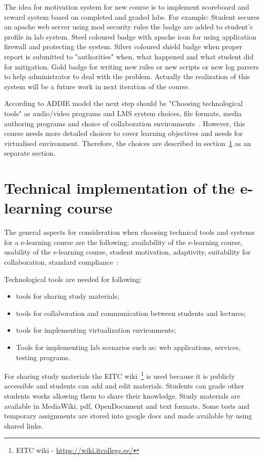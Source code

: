 The idea for motivation system for new course is to implement scoreboard and reward system based on completed and graded labs. For example: Student secures an apache web server using mod security rules the badge are added to student's profile in lab system. Steel coloured badge with apache icon for using application firewall and protecting the system. Silver coloured shield badge when proper report is submitted to "authorities" when, what happened and what student did for mitigation. Gold badge for writing new rules or new scripts or new log parsers to help administrator to deal with the problem. Actually the realization of this system will be a future work in next iteration of the course.

According to \gls{ADDIE} model the next step should be "Choosing technological tools" as audio/video programs and \gls{LMS} system choices, file formats, media authoring programs and choice of collaboration environments~\citep{OppeArenduskeskus2010}. However, this course needs more detailed choices to cover learning objectives and needs for virtualised environment. Therefore, the choices are described in section~\ref{Technical implementation of the e-learning course} as an separate section. 

\section{Technical implementation of the e-learning course}
\label{Technical implementation of the e-learning course}

The general aspects for consideration when choosing technical tools and systems for a e-learning course are the following: availability of the e-learning course, usability of the e-learning course, student motivation, adaptivity, suitability for collaboration, standard compliance~\citep{OppeArenduskeskus2010}:

Technological tools are needed for following: 
\begin{itemize}
\item tools for sharing study materials;
\item tools for collaboration and communication between students and lectures;
\item tools for implementing virtualization environments;
\item Tools for implementing lab scenarios such as: web applications, services, testing programs.
\end{itemize}


For sharing study materials the \gls{EITC} wiki~\footnote{\gls{EITC} wiki - \url{https://wiki.itcollege.ee/}} is used because it is publicly accessible and students can add and edit materials. Students can grade other students works allowing them to share their knowledge. Study materials are available in MediaWiki, pdf, OpenDocument and text formats. Some tests and temporary assignments are stored into google docs and made available by using shared links.

